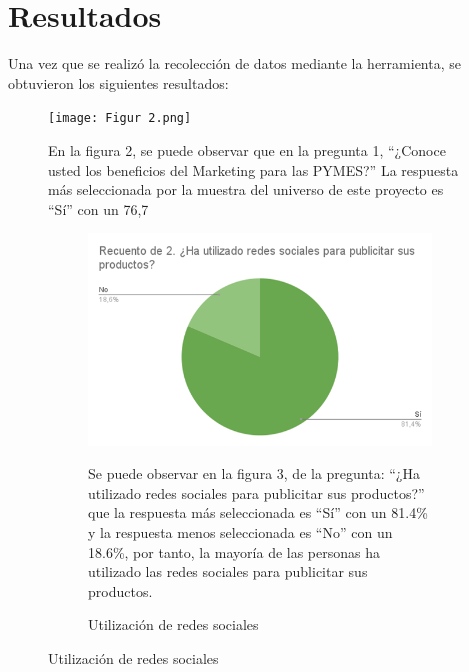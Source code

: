 \documentclass[12pt]{difu100cia} %
\begin{document}
\section{Resultados}

Una vez que se realizó la recolección de datos mediante la herramienta, se obtuvieron los siguientes resultados: 
\begin{figure}[!htb]
	\centering
	\texttt{[image: Figur 2.png]}
	\caption{Del conocimiento de los beneficios del marketing digital}
	\label{diagrama_bloque_rfnoc}


En la figura 2, se puede observar que en la pregunta 1, “¿Conoce usted los beneficios del Marketing para las PYMES?” La respuesta más seleccionada por la muestra del universo de este proyecto es “Sí” con un 76,7%

\begin{figure}[!htb]
	\centering
	\includegraphics[width=\linewidth]{Figura 3.png}
	\caption{Utilización de redes sociales}
	\label{diagrama_bloque_rfnoc}

Se puede observar en la figura 3, de la pregunta: “¿Ha utilizado redes sociales para publicitar sus productos?” que la respuesta más seleccionada es “Sí” con un 81.4\% y la respuesta menos seleccionada es “No” con un 18.6\%, por tanto, la mayoría de las personas ha utilizado las redes sociales para publicitar sus productos.


\end{figure}
\end{figure}
\end{document}
